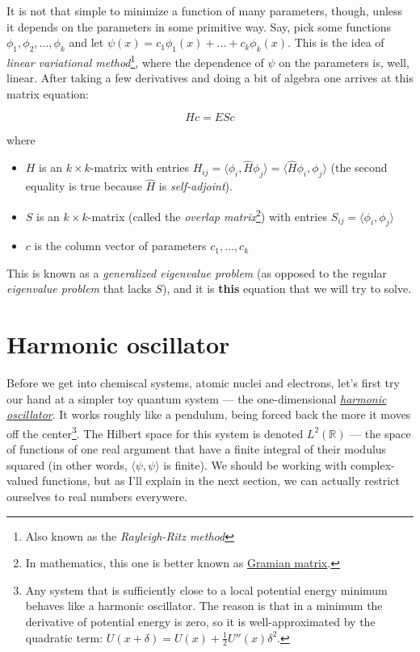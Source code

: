 \documentclass{article}
\begin{document}
It is not that simple to minimize a function of many parameters, though, unless it depends on the parameters in some primitive way. Say, pick some functions \(\phi_1, \phi_2, \dots, \phi_k\) and let \(\psi(x) = c_1 \phi_1(x) + \dots + c_k \phi_k(x) \). This is the idea of \textit{linear variational method}\footnote{Also known as the \textit{Rayleigh-Ritz method}}, where the dependence of \(\psi\) on the parameters is, well, linear. After taking a few derivatives and doing a bit of algebra one arrives\textsuperscript{\cite{ref:atkins}} at this matrix equation:

\begin{equation} \label{eq:var} H c = E S c \end{equation}

where

\begin{itemize}
\item \(H\) is an \(k\times k\)-matrix with entries \(H_{ij} = \langle \phi_i, \hat H \phi_j \rangle = \langle \hat H \phi_i, \phi_j \rangle\) (the second equality is true because \(\hat H\) is \textit{self-adjoint}).
\item \(S\) is an \(k\times k\)-matrix (called the \textit{overlap matrix}\footnote{In mathematics, this one is better known as \href{https://en.wikipedia.org/wiki/Gramian_matrix}{Gramian matrix}.}) with entries \(S_{ij} = \langle \phi_i, \phi_j \rangle\)
\item \(c\) is the column vector of parameters \(c_1, \dots, c_k\)
\end{itemize}

This is known as a \textit{generalized eigenvalue problem} (as opposed to the regular \textit{eigenvalue problem} that lacks \(S\)), and it is \textbf{this} equation that we will try to solve.

\section{Harmonic oscillator} \label{sec:harmonic}

Before we get into chemiscal systems, atomic nuclei and electrons, let's first try our hand at a simpler toy quantum system --- the one-dimensional \href{https://en.wikipedia.org/wiki/Quantum_harmonic_oscillator}{\textit{harmonic oscillator}}. It works roughly like a pendulum, being forced back the more it moves off the center\footnote{Any system that is sufficiently close to a local potential energy minimum behaves like a harmonic oscillator. The reason is that in a minimum the derivative of potential energy is zero, so it is well-approximated by the quadratic term: \(U(x+\delta)=U(x)+\frac{1}{2}U''(x)\delta^2\).}. The Hilbert space for this system is denoted \(L^2(\mathbb R)\) --- the space of functions of one real argument that have a finite integral of their modulus squared (in other words, \(\langle \psi, \psi \rangle\) is finite). We should be working with complex-valued functions, but as I'll explain in the next section, we can actually restrict ourselves to real numbers everywere.
\end{document}
